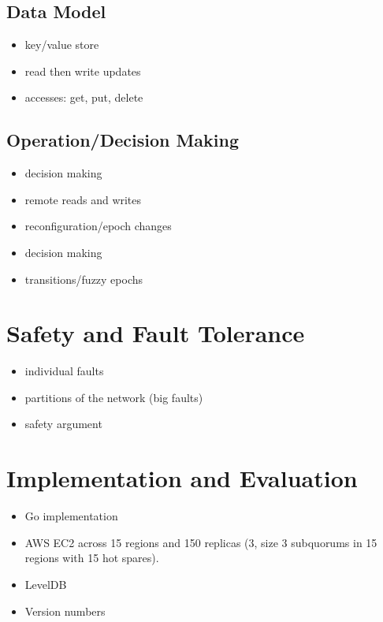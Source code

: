 \documentclass[10pt,twocolumn]{article}
\begin{document}
\subsection*{Data Model}


\begin{itemize}
    \item key/value store
    \item read then write updates 
    \item accesses: get, put, delete
\end{itemize}

\subsection*{Operation/Decision Making}

\begin{itemize}
    \item \sub decision making
    \item remote reads and writes
    \item reconfiguration/epoch changes
    \item \roo decision making
    \item transitions/fuzzy epochs
\end{itemize}

\section*{Safety and Fault Tolerance}

\begin{itemize}
    \item individual faults
    \item partitions of the network (big faults)
    \item safety argument
\end{itemize}

\section*{Implementation and Evaluation}

\begin{itemize}
    \item Go implementation
    \item AWS EC2 across 15 regions and 150 replicas (3, size 3 subquorums in 15 regions with 15 hot spares).
    \item LevelDB
    \item Version numbers
\end{itemize}
\end{document}
